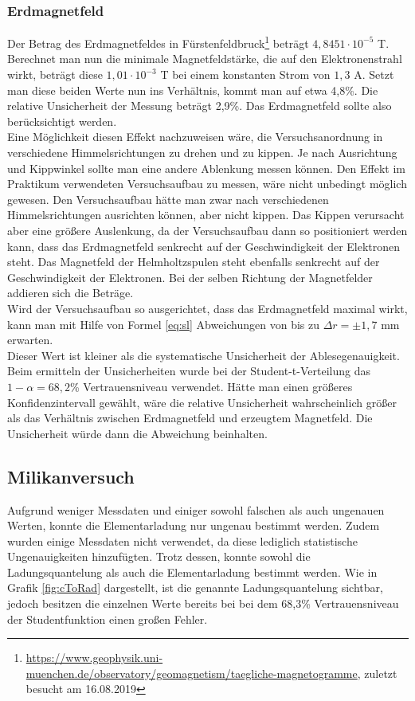 \documentclass[a4paper,usenatbib]{aspdoc}
\begin{document}
            \subsubsection{Erdmagnetfeld}
                Der Betrag des Erdmagnetfeldes in Fürstenfeldbruck\footnote{\url{https://www.geophysik.uni-muenchen.de/observatory/geomagnetism/taegliche-magnetogramme}, zuletzt besucht am 16.08.2019} beträgt $4,8451 \cdot 10^{-5}$ T. Berechnet man nun die minimale Magnetfeldstärke, die auf den Elektronenstrahl wirkt, beträgt diese $1,01 \cdot 10^{-3}$ T bei einem konstanten Strom von $1,3$ A. Setzt man diese beiden Werte nun ins Verhältnis, kommt man auf etwa 4,8\%. Die relative Unsicherheit der Messung beträgt 2,9\%.
                Das Erdmagnetfeld sollte also berücksichtigt werden.\\
                Eine Möglichkeit diesen Effekt nachzuweisen wäre, die Versuchsanordnung in verschiedene Himmelsrichtungen zu drehen und zu kippen. Je nach Ausrichtung und Kippwinkel sollte man eine andere Ablenkung messen können. Den Effekt im Praktikum verwendeten Versuchsaufbau zu messen, wäre nicht unbedingt möglich gewesen. Den Versuchsaufbau hätte man zwar nach verschiedenen Himmelsrichtungen ausrichten können, aber nicht kippen. Das Kippen verursacht aber eine größere Auslenkung, da der Versuchsaufbau dann so positioniert werden kann, dass das Erdmagnetfeld senkrecht auf der Geschwindigkeit der Elektronen steht. Das Magnetfeld der Helmholtzspulen steht ebenfalls senkrecht auf der Geschwindigkeit der Elektronen. Bei der selben Richtung der Magnetfelder addieren sich die Beträge. \\
                Wird der Versuchsaufbau so ausgerichtet, dass das Erdmagnetfeld maximal wirkt, kann man mit Hilfe von Formel \ref{eq:sl} Abweichungen von bis zu $\Delta r = \pm 1,7$ mm erwarten.\\
                Dieser Wert ist kleiner als die systematische Unsicherheit der Ablesegenauigkeit. Beim ermitteln der Unsicherheiten wurde bei der Student-t-Verteilung das $1-\alpha = 68,2$\% Vertrauensniveau verwendet. Hätte man einen größeres Konfidenzintervall gewählt, wäre die relative Unsicherheit wahrscheinlich größer als das Verhältnis zwischen Erdmagnetfeld und erzeugtem Magnetfeld. Die Unsicherheit würde dann die Abweichung beinhalten.

                
        \subsection{Milikanversuch} \label{subsec:dissmilikan}
             Aufgrund weniger Messdaten und einiger sowohl falschen als auch ungenauen Werten, konnte die Elementarladung nur ungenau bestimmt werden. Zudem wurden einige Messdaten nicht verwendet, da diese lediglich statistische Ungenauigkeiten hinzufügten. Trotz dessen, konnte sowohl die Ladungsquantelung als auch die Elementarladung bestimmt werden. Wie in Grafik \ref{fig:cToRad} dargestellt, ist die genannte Ladungsquantelung sichtbar, jedoch besitzen die einzelnen Werte bereits bei bei dem 68,3\% Vertrauensniveau der Studentfunktion einen großen Fehler. 
             
\end{document}
